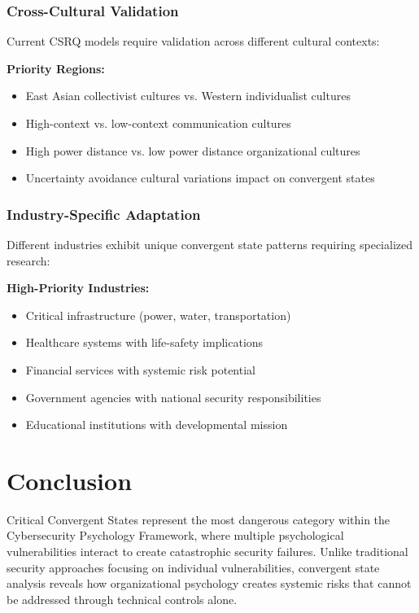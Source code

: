\documentclass[11pt,a4paper]{article}
\begin{document}
\subsubsection{Cross-Cultural Validation}

Current CSRQ models require validation across different cultural contexts:

\textbf{Priority Regions:}
\begin{itemize}
\item East Asian collectivist cultures vs. Western individualist cultures
\item High-context vs. low-context communication cultures
\item High power distance vs. low power distance organizational cultures
\item Uncertainty avoidance cultural variations impact on convergent states
\end{itemize}

\subsubsection{Industry-Specific Adaptation}

Different industries exhibit unique convergent state patterns requiring specialized research:

\textbf{High-Priority Industries:}
\begin{itemize}
\item Critical infrastructure (power, water, transportation)
\item Healthcare systems with life-safety implications
\item Financial services with systemic risk potential
\item Government agencies with national security responsibilities
\item Educational institutions with developmental mission
\end{itemize}

\section{Conclusion}

Critical Convergent States represent the most dangerous category within the Cybersecurity Psychology Framework, where multiple psychological vulnerabilities interact to create catastrophic security failures. Unlike traditional security approaches focusing on individual vulnerabilities, convergent state analysis reveals how organizational psychology creates systemic risks that cannot be addressed through technical controls alone.
\end{document}
